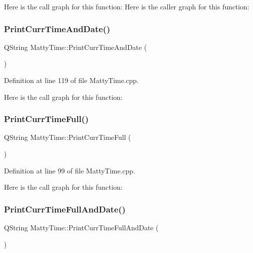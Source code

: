 Here is the call graph for this function\+:
Here is the caller graph for this function\+:
\hypertarget{classMattyTime_a96805256f90a469aa22824a1e2dd219d}{}\label{classMattyTime_a96805256f90a469aa22824a1e2dd219d} 
\subsubsection{\texorpdfstring{Print\+Curr\+Time\+And\+Date()}{PrintCurrTimeAndDate()}}
{\footnotesize\ttfamily Q\+String Matty\+Time\+::\+Print\+Curr\+Time\+And\+Date (\begin{DoxyParamCaption}{ }\end{DoxyParamCaption})\hspace{0.3cm}{\ttfamily [static]}}



Definition at line 119 of file Matty\+Time.\+cpp.

Here is the call graph for this function\+:
\hypertarget{classMattyTime_a9d3500ad88197ee8e2db9f36aec1a266}{}\label{classMattyTime_a9d3500ad88197ee8e2db9f36aec1a266} 
\subsubsection{\texorpdfstring{Print\+Curr\+Time\+Full()}{PrintCurrTimeFull()}}
{\footnotesize\ttfamily Q\+String Matty\+Time\+::\+Print\+Curr\+Time\+Full (\begin{DoxyParamCaption}{ }\end{DoxyParamCaption})\hspace{0.3cm}{\ttfamily [static]}}



Definition at line 99 of file Matty\+Time.\+cpp.

Here is the call graph for this function\+:
\hypertarget{classMattyTime_a82a6b06fa496b4d0f9b8d6e11d5b03c8}{}\label{classMattyTime_a82a6b06fa496b4d0f9b8d6e11d5b03c8} 
\subsubsection{\texorpdfstring{Print\+Curr\+Time\+Full\+And\+Date()}{PrintCurrTimeFullAndDate()}}
{\footnotesize\ttfamily Q\+String Matty\+Time\+::\+Print\+Curr\+Time\+Full\+And\+Date (\begin{DoxyParamCaption}{ }\end{DoxyParamCaption})\hspace{0.3cm}{\ttfamily [static]}}



